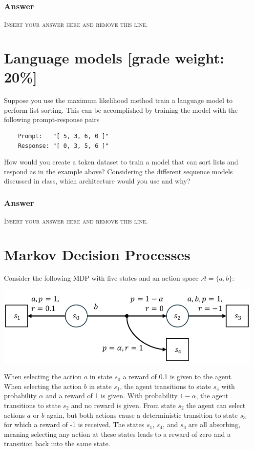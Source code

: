 \documentclass{article}
\begin{document}
\subsubsection*{Answer}
\noindent\textsc{Insert your answer here and remove this line.}

\newpage
\section{Language models [grade weight: 20\%]}

Suppose you use the maximum likelihood method train a language model to perform list sorting.
This can be accomplished by training the model with the following prompt-response pairs
\begin{verbatim}
    Prompt:   "[ 5, 3, 6, 0 ]"
    Response: "[ 0, 3, 5, 6 ]"
\end{verbatim}
How would you create a token dataset to train a model that can sort lists and respond as in the example above?
Considering the different sequence models discussed in class, which architecture would you use and why?

\subsubsection*{Answer}
\noindent\textsc{Insert your answer here and remove this line.}


\newpage
\section{Markov Decision Processes}

Consider the following MDP with five states and an action space $\mathcal{A} = \{ a,b \}$:

\begin{center}
    \includegraphics[scale=1]{mdp.pdf}
\end{center}

When selecting the action $a$ in state $s_0$ a reward of 0.1 is given to the agent.
When selecting the action $b$ in state $s_1$, the agent transitions to state $s_4$ with probability $\alpha$ and a reward of 1 is given.
With probability $1-\alpha$, the agent transitions to state $s_2$ and no reward is given.
From state $s_2$ the agent can select actions $a$ or $b$ again, but both actions cause a deterministic transition to state $s_3$ for which a reward of -1 is received.
The states $s_1$, $s_4$, and $s_3$ are all absorbing, meaning selecting any action at these states leads to a reward of zero and a transition back into the same state.
\end{document}

